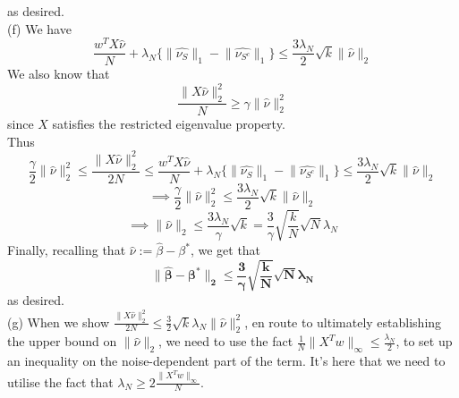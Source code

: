 \documentclass[a4paper,11pt]{article}
\numberwithin{definition}{section}
\numberwithin{mytheorem}{subsection}
\begin{document}
as desired.\\
(f) We have 
$$\frac{w^TX\widehat{\nu}}{N} + \lambda_N\{\lVert\widehat{\nu_S}\rVert_1 - \lVert\widehat{\nu_{S^c}}\rVert_1\} \leq \frac{3\lambda_N}{2}\sqrt{k}\lVert\widehat{\nu}\rVert_2$$
We also know that 
$$\frac{\lVert X\widehat{\nu}\rVert_2^2}{N}\geq \gamma\lVert\widehat{\nu}\rVert_2^2$$
since $X$ satisfies the restricted eigenvalue property.\\
Thus
$$\frac{\gamma}{2}\lVert\widehat{\nu}\rVert_2^2\leq\frac{\lVert X\widehat{\nu}\rVert_2^2}{2N}\leq\frac{w^TX\widehat{\nu}}{N} + \lambda_N\{\lVert\widehat{\nu_S}\rVert_1 - \lVert\widehat{\nu_{S^c}}\rVert_1\}\leq\frac{3\lambda_N}{2}\sqrt{k}\lVert\widehat{\nu}\rVert_2$$
$$\implies \frac{\gamma}{2}\lVert\widehat{\nu}\rVert_2^2\leq\frac{3\lambda_N}{2}\sqrt{k}\lVert\widehat{\nu}\rVert_2$$
$$\implies \lVert\widehat{\nu}\rVert_2\leq\frac{3\lambda_N}{\gamma}\sqrt{k} = \frac{3}{\gamma}\sqrt{\frac{k}{N}}\sqrt{N}\lambda_N$$
Finally, recalling that $\widehat{\nu} := \widehat{\beta} - \beta^*$, we get that 
$$\boldsymbol{\lVert\widehat{\beta} - \beta^*\rVert_2\leq\frac{3}{\gamma}\sqrt{\frac{k}{N}}\sqrt{N}\lambda_N}$$
as desired.\\
(g) When we show $\frac{\lVert X\widehat{\nu}\rVert^2_2}{2N}\leq \frac{3}{2}\sqrt{k}\lambda_N\lVert\widehat{\nu}\rVert_2^2$, en route to ultimately establishing the upper bound on $\lVert\widehat{\nu}\rVert_2$, we need to use the fact $\frac{1}{N}\lVert X^Tw\rVert_{\infty}\leq\frac{\lambda_N}{2}$, to set up an inequality on the noise-dependent part of the term. It's here that we need to utilise the fact that $\lambda_N \geq 2\frac{\lVert X^Tw\rVert_{\infty}}{N}$.
\end{document}
